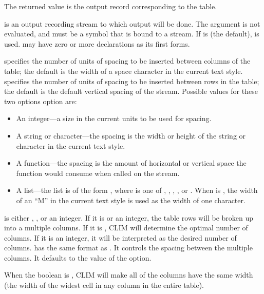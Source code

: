 The returned value is the output record corresponding to the table.

 is an output recording stream to which output will be done.  The
 argument is not evaluated, and must be a symbol that is bound to a
stream.  If  is  (the default),  is
used.   may have zero or more declarations as its first forms.

 specifies the number of units of spacing to be inserted between
columns of the table; the default is the width of a space character in the
current text style.   specifies the number of units of spacing to
be inserted between rows in the table; the default is the default vertical
spacing of the stream.  Possible values for these two options option are:

\begin{itemize}
\item An integer---a size in the current units to be used for spacing.

\item A string or character---the spacing is the width or height of the string
or character in the current text style.

\item A function---the spacing is the amount of horizontal or vertical space the
function would consume when called on the stream.

\item A list---the list is of the form , where
 is one of , , , , or
.  When  is , the width of an ``M'' in the
current text style is used as the width of one character.
\end{itemize}

 is either , , or an integer.  If it is
 or an integer, the table rows will be broken up into a multiple columns.
If it is , CLIM will determine the optimal number of columns.  If it is an
integer, it will be interpreted as the desired number of columns.
 has the same format as .  It
controls the spacing between the multiple columns.  It defaults to the value of
the  option.

When the boolean  is , CLIM will make all
of the columns have the same width (the width of the widest cell in any column
in the entire table).

